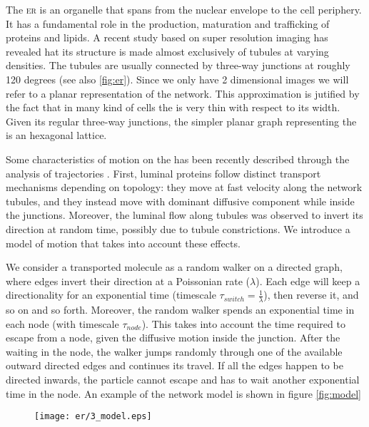 The \textsc{er} is an organelle that spans from the nuclear envelope to the cell periphery. It has a fundamental role in the production, maturation and trafficking of proteins and lipids. A recent study based on super resolution imaging  has revealed hat its structure is made almost exclusively of tubules at varying densities. The tubules are usually connected by three-way junctions at roughly 120 degrees  (see also \cref{fig:er}). Since we only have 2 dimensional images we will refer to a planar representation of the  network. This approximation is jutified by the fact that in many kind of cells the  is very thin with respect to its width. Given its regular three-way junctions, the simpler planar graph representing the  is an hexagonal lattice.

Some characteristics of motion on the  has been recently described through the analysis of  trajectories . First, luminal proteins follow distinct transport mechanisms depending on topology: they move at fast velocity along the network tubules, and they instead move with dominant diffusive component while inside the junctions. Moreover, the luminal flow along tubules was observed to invert its direction at random time, possibly due to tubule constrictions. We introduce a model of motion that takes into account these effects.

We consider a transported molecule as a random walker on a directed graph, where edges invert their direction at a Poissonian rate ($\lambda$). Each edge will keep a directionality for an exponential time (timescale $\tau_{switch} = \frac{1}{\lambda}$), then reverse it, and so on and so forth. Moreover, the random walker spends an exponential time in each node (with timescale $\tau_{node}$). This takes into account the time required to escape from a node, given the diffusive motion inside the junction. After the waiting in the node, the walker jumps randomly through one of the available outward directed edges and continues its travel. If all the edges happen to be directed inwards, the particle cannot escape and has to wait another exponential time in the node. An example of the network model is shown in figure \ref{fig:model}

\begin{figure}
  \texttt{[image: er/3\_model.eps]}
\end{figure}


